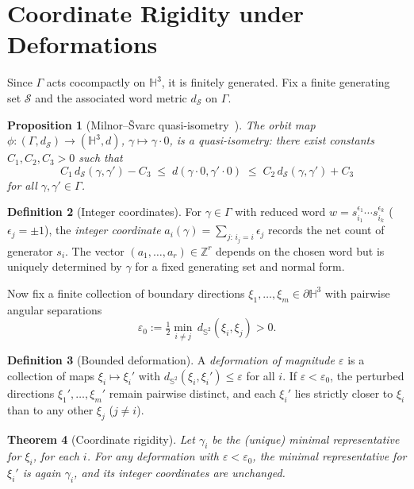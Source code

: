 \documentclass[12pt]{article}
\newtheorem{theorem}{Theorem}[section]
\newtheorem{proposition}[theorem]{Proposition}
\theoremstyle{definition}
\newtheorem{definition}[theorem]{Definition}
\theoremstyle{remark}
\newcommand{\Z}{\mathbb{Z}}
\begin{document}
\section{Coordinate Rigidity under Deformations}
\label{sec:rigidity}

Since $\Gamma$ acts cocompactly on $\mathbb{H}^3$, it is finitely generated.
Fix a finite generating set $\mathcal{S}$ and the associated word metric
$d_\mathcal{S}$ on $\Gamma$.

\begin{proposition}[Milnor--\v{S}varc quasi-isometry~\cite{bridsonhaefliger}]
\label{prop:msvarc}
The orbit map $\phi\colon(\Gamma,d_\mathcal{S})\to(\mathbb{H}^3,d)$,
$\gamma\mapsto\gamma\cdot0$, is a quasi-isometry: there exist constants
$C_1,C_2,C_3>0$ such that
\[
C_1\,d_\mathcal{S}(\gamma,\gamma')-C_3
\;\le\;
d(\gamma\cdot0,\gamma'\cdot0)
\;\le\;
C_2\,d_\mathcal{S}(\gamma,\gamma')+C_3
\]
for all $\gamma,\gamma'\in\Gamma$.
\end{proposition}

\begin{definition}[Integer coordinates]\label{def:intcoords}
For $\gamma\in\Gamma$ with reduced word $w=s_{i_1}^{\epsilon_1}\cdots
s_{i_k}^{\epsilon_k}$ ($\epsilon_j=\pm1$), the \emph{integer coordinate}
$a_i(\gamma)=\sum_{j:\,i_j=i}\epsilon_j$ records the net count of
generator $s_i$. The vector $(a_1,\ldots,a_r)\in\Z^r$ depends on the
chosen word but is uniquely determined by $\gamma$ for a fixed generating
set and normal form.
\end{definition}

Now fix a finite collection of boundary directions
$\xi_1,\ldots,\xi_m\in\partial\mathbb{H}^3$ with pairwise angular separations
\[
\varepsilon_0 := \tfrac{1}{2}\min_{i\neq j}\,d_{\mathbb{S}^2}(\xi_i,\xi_j) > 0.
\]

\begin{definition}[Bounded deformation]\label{def:deform}
A \emph{deformation of magnitude $\varepsilon$} is a collection of maps
$\xi_i\mapsto\xi_i'$ with $d_{\mathbb{S}^2}(\xi_i,\xi_i')\le\varepsilon$
for all $i$. If $\varepsilon<\varepsilon_0$, the perturbed directions
$\xi_1',\ldots,\xi_m'$ remain pairwise distinct, and each $\xi_i'$ lies
strictly closer to $\xi_i$ than to any other $\xi_j$ ($j\neq i$).
\end{definition}

\begin{theorem}[Coordinate rigidity]\label{thm:rigidity}
Let $\gamma_i$ be the (unique) minimal representative for $\xi_i$, for
each $i$. For any deformation with $\varepsilon<\varepsilon_0$, the minimal
representative for $\xi_i'$ is again $\gamma_i$, and its integer coordinates
are unchanged.
\end{theorem}
\end{document}
